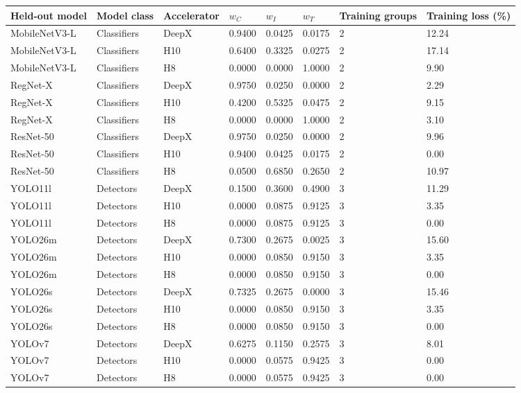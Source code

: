 \begin{tabular}{@{}llllllll@{}}
\toprule
Held-out model & Model class & Accelerator & $w_C$ & $w_I$ & $w_T$ & Training groups & Training loss (\%) \\
\midrule
MobileNetV3-L & Classifiers & DeepX & 0.9400 & 0.0425 & 0.0175 & 2 & 12.24 \\
MobileNetV3-L & Classifiers & H10 & 0.6400 & 0.3325 & 0.0275 & 2 & 17.14 \\
MobileNetV3-L & Classifiers & H8 & 0.0000 & 0.0000 & 1.0000 & 2 & 9.90 \\
RegNet-X & Classifiers & DeepX & 0.9750 & 0.0250 & 0.0000 & 2 & 2.29 \\
RegNet-X & Classifiers & H10 & 0.4200 & 0.5325 & 0.0475 & 2 & 9.15 \\
RegNet-X & Classifiers & H8 & 0.0000 & 0.0000 & 1.0000 & 2 & 3.10 \\
ResNet-50 & Classifiers & DeepX & 0.9750 & 0.0250 & 0.0000 & 2 & 9.96 \\
ResNet-50 & Classifiers & H10 & 0.9400 & 0.0425 & 0.0175 & 2 & 0.00 \\
ResNet-50 & Classifiers & H8 & 0.0500 & 0.6850 & 0.2650 & 2 & 10.97 \\
YOLO11l & Detectors & DeepX & 0.1500 & 0.3600 & 0.4900 & 3 & 11.29 \\
YOLO11l & Detectors & H10 & 0.0000 & 0.0875 & 0.9125 & 3 & 3.35 \\
YOLO11l & Detectors & H8 & 0.0000 & 0.0875 & 0.9125 & 3 & 0.00 \\
YOLO26m & Detectors & DeepX & 0.7300 & 0.2675 & 0.0025 & 3 & 15.60 \\
YOLO26m & Detectors & H10 & 0.0000 & 0.0850 & 0.9150 & 3 & 3.35 \\
YOLO26m & Detectors & H8 & 0.0000 & 0.0850 & 0.9150 & 3 & 0.00 \\
YOLO26s & Detectors & DeepX & 0.7325 & 0.2675 & 0.0000 & 3 & 15.46 \\
YOLO26s & Detectors & H10 & 0.0000 & 0.0850 & 0.9150 & 3 & 3.35 \\
YOLO26s & Detectors & H8 & 0.0000 & 0.0850 & 0.9150 & 3 & 0.00 \\
YOLOv7 & Detectors & DeepX & 0.6275 & 0.1150 & 0.2575 & 3 & 8.01 \\
YOLOv7 & Detectors & H10 & 0.0000 & 0.0575 & 0.9425 & 3 & 0.00 \\
YOLOv7 & Detectors & H8 & 0.0000 & 0.0575 & 0.9425 & 3 & 0.00 \\
\bottomrule
\end{tabular}
